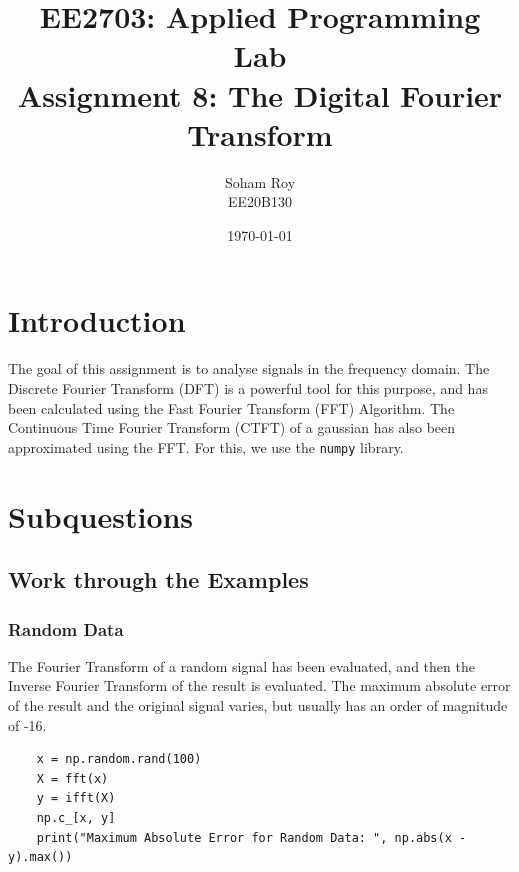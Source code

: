 \documentclass[12pt, a4paper]{article}
\title{EE2703: Applied Programming Lab \\ \Large Assignment 8: The Digital Fourier Transform}
\author{Soham Roy \\ \normalsize EE20B130}
\date{\today}
\newcommand{\code}{\lstinline[basicstyle=\small]}
\begin{document}
\maketitle %



\section{Introduction}
The goal of this assignment is to analyse signals in the frequency domain. The Discrete Fourier Transform (DFT)
is a powerful tool for this purpose, and has been calculated using the Fast Fourier Transform (FFT) Algorithm.
The Continuous Time Fourier Transform (CTFT) of a gaussian has also been approximated using the FFT. For this,
we use the \code{numpy} library.



\section{Subquestions}

\subsection{Work through the Examples}

\subsubsection{Random Data}
The Fourier Transform of a random signal has been evaluated, and then the Inverse Fourier Transform of
the result is evaluated. The maximum absolute error of the result and the original signal varies, but usually
has an order of magnitude of -16.
\begin{lstlisting}
    x = np.random.rand(100)
    X = fft(x)
    y = ifft(X)
    np.c_[x, y]
    print("Maximum Absolute Error for Random Data: ", np.abs(x - y).max())
\end{lstlisting}
\end{document}
